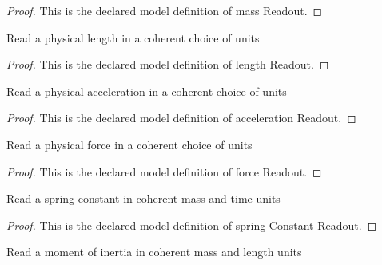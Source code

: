 \begin{proof}
  This is the declared model definition of mass Readout.
\end{proof}
\begin{definition}
  \label{def:physics:phyx-mini-0233:phyxminiproblems-problemphyxmini0233-lengthreadout}
  Read a physical length in a coherent choice of units
\end{definition}
\begin{proof}
  This is the declared model definition of length Readout.
\end{proof}
\begin{definition}
  \label{def:physics:phyx-mini-0233:phyxminiproblems-problemphyxmini0233-accelerationreadout}
  Read a physical acceleration in a coherent choice of units
\end{definition}
\begin{proof}
  This is the declared model definition of acceleration Readout.
\end{proof}
\begin{definition}
  \label{def:physics:phyx-mini-0233:phyxminiproblems-problemphyxmini0233-forcereadout}
  Read a physical force in a coherent choice of units
\end{definition}
\begin{proof}
  This is the declared model definition of force Readout.
\end{proof}
\begin{definition}
  \label{def:physics:phyx-mini-0233:phyxminiproblems-problemphyxmini0233-springconstantreadout}
  Read a spring constant in coherent mass and time units
\end{definition}
\begin{proof}
  This is the declared model definition of spring Constant Readout.
\end{proof}
\begin{definition}
  \label{def:physics:phyx-mini-0233:phyxminiproblems-problemphyxmini0233-momentofinertiareadout}
  Read a moment of inertia in coherent mass and length units
\end{definition}
